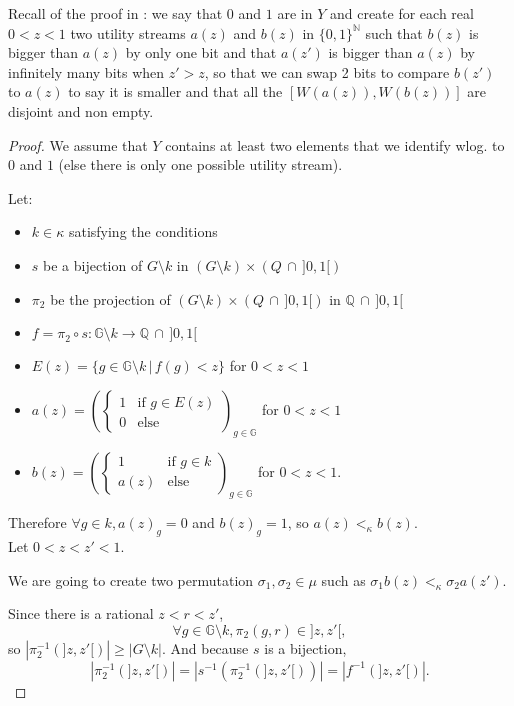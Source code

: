 \documentclass{article}
\begin{document}
Recall of the proof in \cite{basumitra03} : we say that $0$ and $1$ are in $Y$ and create for each real $0<z<1$ two utility streams $a(z)$ and $b(z)$ in $\{0,1\}^{\mathbb N}$ such that $b(z)$ is bigger than $a(z)$ by only one bit and that $a(z')$ is bigger than $a(z)$ by infinitely many bits when $z'>z$, so that we can swap 2 bits to compare $b(z')$ to $a(z)$ to say it is smaller and that all the $[W(a(z)),W(b(z))]$ are disjoint and non empty.

\begin{proof}
  We assume that $Y$ contains at least two elements that we identify wlog. to $0$ and $1$ (else there is only one possible utility stream).

  Let:
  \begin{itemize}
  \item $k\in\kappa$ satisfying the conditions
  \item $s$ be a bijection of $G\setminus k$ in $(G\setminus k)\times (Q\,\cap\,]0,1[)$
  \item $\pi_2$ be the projection of $(G\setminus k)\times (Q\,\cap\,]0,1[)$ in $\mathbb Q\,\cap\,]0,1[$
  \item $f=\pi_2\circ s:\mathbb G\setminus k\to\mathbb Q\,\cap\,]0,1[$
  \item $E(z)=\{g\in \mathbb G\setminus k\,|\, f(g)<z\}$ for $0<z<1$
  \item $\displaystyle a(z)=\left(\left\{\begin{array}{ll}1&\text{if }g\in E(z)\\0&\text{else}\end{array}\right.\right)_{g\in\mathbb G}$ for $0<z<1$
  \item $\displaystyle b(z)=\left(\left\{\begin{array}{ll}1&\text{if }g\in k\\a(z)&\text{else}\end{array}\right.\right)_{g\in\mathbb G}$ for $0<z<1$.
  \end{itemize}

  Therefore $\forall g\in k, a(z)_g=0$ and $b(z)_g=1$, so $a(z)<_\kappa b(z)$. \\

  Let $0<z<z'<1$.

  We are going to create two permutation $\sigma_1,\sigma_2\in\mu$ such as $\sigma_1 b(z)<_\kappa \sigma_2 a(z')$.

  Since there is a rational $z<r<z'$,
  \[\forall g\in \mathbb G\setminus k, \pi_2(g,r)\in]z,z'[,\]
  so $|\pi_2^{-1}(]z,z'[)|\geq|G\setminus k|$. And because $s$ is a bijection,
  \[|\pi_2^{-1}(]z,z'[)|=|s^{-1}(\pi_2^{-1}(]z,z'[))|= |f^{-1}(]z,z'[)|.\]


\end{proof}
\end{document}
